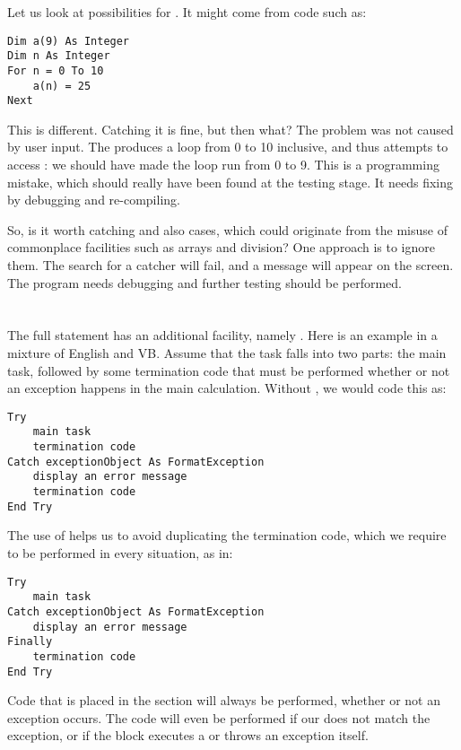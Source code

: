 		Let us look at possibilities for . It might come from code such as:
		\begin{lstlisting}
Dim a(9) As Integer
Dim n As Integer
For n = 0 To 10
	a(n) = 25
Next
		\end{lstlisting}
		This is different. Catching it is fine, but then what? The problem was not caused by user input. The  produces a loop from 0 to 10 inclusive, and thus attempts to access : we should have made the loop run from 0 to 9. This is a programming mistake, which should really have been found at the testing stage. It needs fixing by debugging and re-compiling.
		
		So, is it worth catching  and also  cases, which could originate from the misuse of commonplace facilities such as arrays and division? One approach is to ignore them. The search for a catcher will fail, and a message will appear on the screen. The program needs debugging and further testing should be performed.


	\section{}
		The full  statement has an additional facility, namely . Here is an example in a mixture of English and VB. Assume that the task falls into two parts: the main task, followed by some termination code that must be performed whether or not an exception happens in the main calculation. Without , we would code this as:
		\begin{lstlisting}
Try
	main task
	termination code
Catch exceptionObject As FormatException
	display an error message
	termination code
End Try
		\end{lstlisting}
		The use of  helps us to avoid duplicating the termination code, which we require to be performed in every situation, as in:
		\begin{lstlisting}
Try
	main task
Catch exceptionObject As FormatException
	display an error message
Finally
	termination code
End Try
		\end{lstlisting}
		Code that is placed in the  section will always be performed, whether or not an exception occurs. The  code will even be performed if our  does not match the exception, or if the  block executes a  or throws an exception itself.


